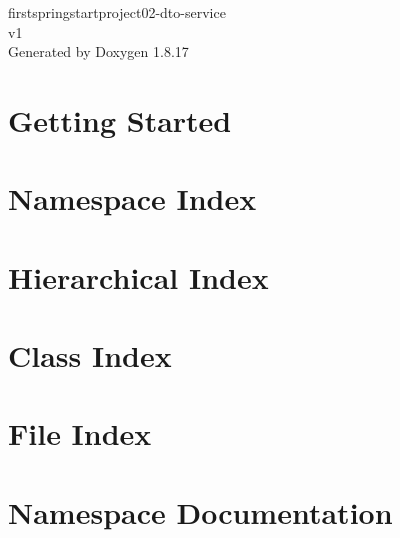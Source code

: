 \let\mypdfximage\pdfximage\def\pdfximage{\immediate\mypdfximage}\documentclass[twoside]{book}
\newcommand{\+}{\discretionary{\mbox{\scriptsize$\hookleftarrow$}}{}{}}
\newcommand{\clearemptydoublepage}{%
  \newpage{\pagestyle{empty}\cleardoublepage}%
}
\begin{document}
\begin{titlepage}
\vspace*{7cm}
\begin{center}%
{\Large firstspringstartproject02-\/dto-\/service \\[1ex]\large v1 }\\
\vspace*{1cm}
{\large Generated by Doxygen 1.8.17}\\
\end{center}
\end{titlepage}
\clearemptydoublepage
{}
\tableofcontents
\clearemptydoublepage
{}

\chapter{Getting Started}
\label{md__c_1__users__admin__desktop__p_o_e_c__java_sources_sprintboot_firstspringstartproject02-dto-service__h_e_l_p}

\chapter{Namespace Index}

\chapter{Hierarchical Index}

\chapter{Class Index}

\chapter{File Index}

\chapter{Namespace Documentation}








\end{document}

